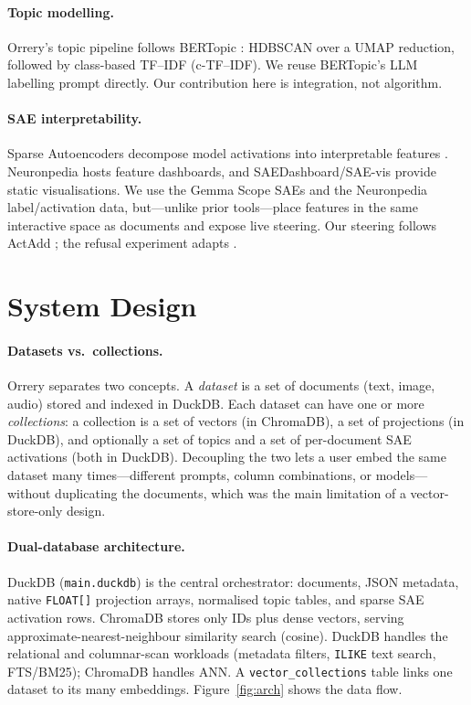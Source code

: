 \documentclass[11pt]{article}
\begin{document}
\paragraph{Topic modelling.} Orrery's topic pipeline follows BERTopic
\citep{grootendorst2022bertopic}: HDBSCAN over a UMAP reduction, followed
by class-based TF--IDF (c-TF--IDF). We reuse BERTopic's LLM labelling
prompt directly. Our contribution here is integration, not algorithm.

\paragraph{SAE interpretability.} Sparse Autoencoders decompose model
activations into interpretable features \citep{bricken2023monosemanticity,
templeton2024scaling}. Neuronpedia \citep{neuronpedia} hosts feature
dashboards, and SAEDashboard/SAE-vis provide static visualisations. We use
the Gemma Scope SAEs \citep{lieberum2024gemmascope} and the Neuronpedia
label/activation data, but---unlike prior tools---place features in the
same interactive space as documents and expose live steering. Our steering
follows ActAdd \citep{turner2023actadd}; the refusal experiment adapts
\citet{arditi2024refusal}.

\section{System Design}
\label{sec:design}

\paragraph{Datasets vs.\ collections.} Orrery separates two concepts. A
\emph{dataset} is a set of documents (text, image, audio) stored and
indexed in DuckDB. Each dataset can have one or more \emph{collections}: a
collection is a set of vectors (in ChromaDB), a set of projections (in
DuckDB), and optionally a set of topics and a set of per-document SAE
activations (both in DuckDB). Decoupling the two lets a user embed the same
dataset many times---different prompts, column combinations, or
models---without duplicating the documents, which was the main limitation
of a vector-store-only design.

\paragraph{Dual-database architecture.} DuckDB
(\texttt{main.duckdb}) is the central orchestrator: documents, JSON
metadata, native \texttt{FLOAT[]} projection arrays, normalised topic
tables, and sparse SAE activation rows. ChromaDB stores only IDs plus dense
vectors, serving approximate-nearest-neighbour similarity search (cosine).
DuckDB handles the relational and columnar-scan workloads (metadata
filters, \texttt{ILIKE} text search, FTS/BM25); ChromaDB handles ANN. A
\texttt{vector\_collections} table links one dataset to its many
embeddings. Figure~\ref{fig:arch} shows the data flow.
\end{document}
